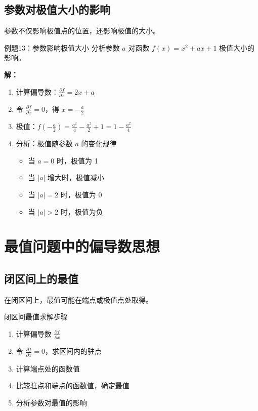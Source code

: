 \documentclass[a4paper,11pt]{ctexart}
\newcommand{\partialder}[2]{\frac{\partial #1}{\partial #2}}
\theoremstyle{definition}
\theoremstyle{remark}
\begin{document}
\subsection{参数对极值大小的影响}

参数不仅影响极值点的位置，还影响极值的大小。

\begin{examplebox}{例题13：参数影响极值大小}
分析参数 $a$ 对函数 $f(x) = x^2 + ax + 1$ 极值大小的影响。

\textbf{解：}
\begin{enumerate}
    \item 计算偏导数：$\partialder{f}{x} = 2x + a$
    \item 令 $\partialder{f}{x} = 0$，得 $x = -\frac{a}{2}$
    \item 极值：$f(-\frac{a}{2}) = \frac{a^2}{4} - \frac{a^2}{2} + 1 = 1 - \frac{a^2}{4}$
    \item 分析：极值随参数 $a$ 的变化规律
    \begin{itemize}
        \item 当 $a = 0$ 时，极值为 1
        \item 当 $|a|$ 增大时，极值减小
        \item 当 $|a| = 2$ 时，极值为 0
        \item 当 $|a| > 2$ 时，极值为负
    \end{itemize}
\end{enumerate}
\end{examplebox}

\section{最值问题中的偏导数思想}

\subsection{闭区间上的最值}

在闭区间上，最值可能在端点或极值点处取得。

\begin{methodbox}{闭区间最值求解步骤}
\begin{enumerate}
    \item 计算偏导数 $\partialder{f}{x}$
    \item 令 $\partialder{f}{x} = 0$，求区间内的驻点
    \item 计算端点处的函数值
    \item 比较驻点和端点的函数值，确定最值
    \item 分析参数对最值的影响
\end{enumerate}
\end{methodbox}
\end{document}
